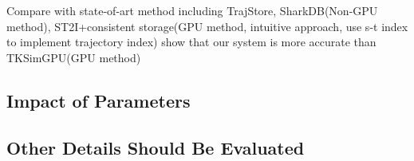 \documentclass[conference]{IEEEtran}
\begin{document}
Compare with state-of-art method including TrajStore, SharkDB(Non-GPU method), ST2I+consistent storage(GPU method, intuitive approach, use s-t index to implement trajectory index) 
show that our system is more accurate than TKSimGPU(GPU method)

\subsection{Impact of Parameters}
\subsection{Other Details Should Be Evaluated}





%
%



%
%
\end{document}
